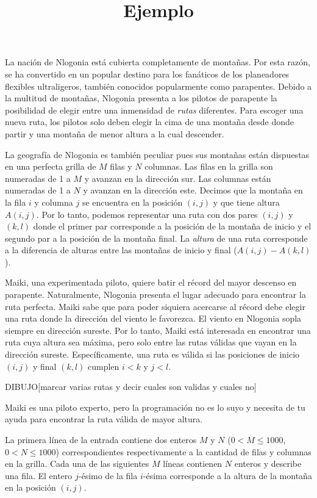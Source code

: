 \documentclass{oci}
\title{Ejemplo}
\begin{document}
\begin{problemDescription}

La nación de Nlogonia está cubierta completamente de montañas.
Por esta razón, se ha convertido en un popular destino para los fanáticos de los planeadores
flexibles ultraligeros, también conocidos popularmente como parapentes.
Debido a la multitud de montañas, Nlogonia presenta a los pilotos de parapente la posibilidad de
elegir entre una inmensidad de \emph{rutas} diferentes.
Para escoger una nueva ruta, los pilotos solo deben elegir la cima de una montaña desde donde
partir y una montaña de menor altura a la cual descender.

La geografía de Nlogonia es también peculiar pues sus montañas están dispuestas en una perfecta
grilla de $M$ filas y $N$ columnas.
Las filas en la grilla son numeradas de 1 a $M$ y avanzan en la dirección sur.
Las columnas están numeradas de 1 a $N$ y avanzan en la dirección este.
Decimos que la montaña en la fila $i$ y columna $j$ se encuentra en la posición $(i,j)$ y que
tiene altura $A(i,j)$.
Por lo tanto, podemos representar una ruta con dos pares $(i, j)$ y $(k,l)$ donde el primer par
corresponde a la posición de la montaña de inicio y el segundo par a la posición de la montaña
final.
La \emph{altura} de una ruta corresponde a la diferencia de alturas entre las montañas de
inicio y final ($A(i, j) - A(k, l)$).

Maiki, una experimentada piloto, quiere batir el récord del mayor descenso en parapente.
Naturalmente, Nlogonia presenta el lugar adecuado para encontrar la ruta perfecta.
Maiki sabe que para poder siquiera acercarse al récord debe elegir una ruta donde la dirección
del viento le favorezca.
El viento en Nlogonia sopla siempre en dirección sureste.
Por lo tanto, Maiki está interesada en encontrar una ruta cuya altura sea máxima,
pero solo entre las rutas válidas que vayan en la dirección sureste.
Específicamente, una ruta es válida si las posiciones de inicio $(i, j)$ y final $(k, l)$
cumplen $i < k$ y $j < l$.

DIBUJO[marcar varias rutas y decir cuales son validas y cuales no]

Maiki es una piloto experto, pero la programación no es lo suyo y necesita de tu ayuda para
encontrar la ruta válida de mayor altura.

\end{problemDescription}

\begin{inputDescription}
La primera línea de la entrada contiene dos enteros $M$ y $N$ ($0 < M \leq 1000$, $0 < N \leq 1000$)
correspondientes respectivamente a la cantidad de filas y columnas en la grilla.
Cada una de las siguientes $M$ líneas contienen $N$ enteros y describe una fila.
El entero $j$-ésimo de la fila $i$-ésima corresponde a la altura de la montaña en la posición $(i,j)$.
\end{inputDescription}
\end{document}
